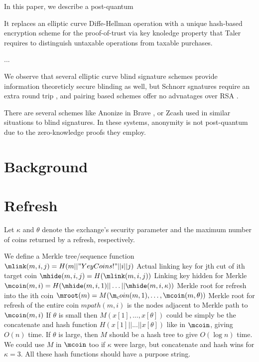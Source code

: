 \documentclass{llncs}
\begin{document}
In this paper, we describe a post-quantum 

It replaces an elliptic curve Diffe-Hellman operation with a unique
hash-based encryption scheme for the proof-of-trust via key knoledge
property that Taler requires to distinguish untaxable operations from
taxable purchases. 

...

\smallskip

We observe that several elliptic curve blind signature schemes provide
information theoreticly secure blinding as well, but 
 Schnorr sgnatures require an extra round trip \cite{??}, and
 pairing based schemes offer no advnatages over RSA \cite{??}.

There are several schemes like Anonize \cite{} in Brave \cite{}, 
or Zcash \cite{} used in similar situations to blind signatures. 
In these systems, anonymity is not post-quantum due to the zero-knowledge
proofs they employ.




\section{Background}


\section{Refresh}


Let $\kappa$ and $\theta$ denote
 the exchange's security parameter and
 the maximum number of coins returned by a refresh, respectively. 

We define a Merkle tree/sequence function 
  $\mlink(m,i,j) = H(m || "YeyCoins!" || i || j)$ 
        Actual linking key for jth cut of ith target coin
  $\mhide(m,i,j) = H( \mlink(m,i,j) )$
        Linking key hidden for Merkle
  $\mcoin(m,i) = H( \mhide(m,i,1) || \ldots || \mhide(m,i,\kappa) )$
        Merkle root for refresh into the ith coin
  $\mroot(m) = M( \m_coin(m,1), \ldots, \mcoin(m,\theta) )$
        Merkle root for refresh of the entire coin
  $mpath(m,i)$ is the nodes adjacent to Merkle path to $\mcoin(m,i)$
If $\theta$ is small then $M(x[1],\ldots,x[\theta])$ could be simply be
the concatenate and hash function $H( x[1] || ... || x[\theta] )$ like
in $\mcoin$, giving $O(n)$ time.  If $\theta$ is large, then $M$ should
be a hash tree to give $O(\log n)$ time.  We could use $M$ in $\mcoin$
too if $\kappa$ were large, but concatenate and hash wins for $\kappa=3$.
All these hash functions should have a purpose string.
\end{document}
